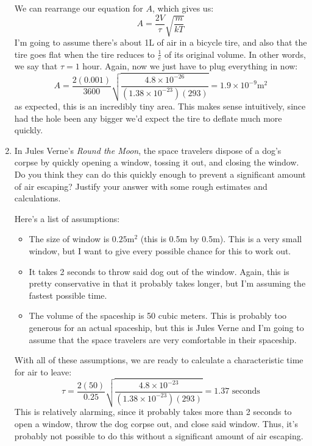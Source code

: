 \documentclass[11pt]{article}
\begin{document}
\begin{enumerate}[label=\alph*)]
			\begin{solution}
				We can rearrange our equation for $A$, which gives us:
				\[
				A = \frac{2V}{\tau}\sqrt{\frac{m}{kT}} 
				\] 
				I'm going to assume there's about 1L of air in a bicycle tire, and also that the tire goes flat 
				when the tire reduces to $\frac{1}{e}$ of its original volume. In other words, we say that 
				$\tau = 1$ hour. Again, now we just have to plug everything in now:
				\[
					A = \frac{2(0.001)}{3600} \sqrt{\frac{4.8 \times 10^{-26}}{(1.38 \times 10^{-23})(293)}}  = 
					1.9 \times 10^{-9} \mathrm{m^2}
				\] 
				as expected, this is an incredibly tiny area. This makes sense intuitively, since had the hole 
				been any bigger we'd expect the tire to deflate much more quickly.
			\end{solution}
		\item In Jules Verne's \textit{Round the Moon}, the space travelers dispose of a dog's corpse 
			by quickly opening a window, tossing it out, and closing the window. Do you think they can do this 
			quickly enough to prevent a significant amount of air escaping? Justify your answer with some rough 
			estimates and calculations. 

			\begin{solution}
				Here's a list of assumptions:
				\begin{itemize}
					\item The size of window is $0.25 \mathrm{m^2}$ (this is 0.5m by 0.5m). This is a very small 
						window, but I want to 
						give every possible chance for this to work out. 
					\item It takes 2 seconds to throw said dog out of the window. Again, this is pretty 
						conservative in that it probably takes longer, but I'm assuming the fastest possible
						time. 
					\item The volume of the spaceship is 50 cubic meters. This is probably too generous for 
						an actual spaceship, but this is Jules Verne and I'm going to assume that the 
						space travelers are very comfortable in their spaceship. 
				\end{itemize}
				With all of these assumptions, we are ready to calculate a characteristic time for air to 
				leave:
				\[
					\tau = \frac{2(50)}{0.25}\sqrt{\frac{4.8 \times 10^{-23}}{(1.38 \times 10^{-23})(293)}} = 1.37 \text{ seconds}
				\] 
				This is relatively alarming, since it probably takes more than 2 seconds to open a window, 
				throw the dog corpse out, and close said window. Thus, it's probably not possible to do this 
				without a significant amount of air escaping. 
			\end{solution}
	\end{enumerate}
\end{document}
